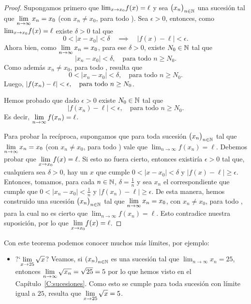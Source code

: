 \begin{proof}
Supongamos primero que ${\lim_{x\to x_0}} f(x)=\ell$ y sea $\big(x_n\big)_{n\in\mathbb{N}}$ una sucesión tal que $\displaystyle\lim_{n\to\infty} x_n = x_0$ (con $x_n\neq x_0$, para todo \niN).
Sea $\epsilon>0$, entonces, como ${\lim_{x\to x_0}} f(x)=\ell$ existe $\delta>0$ tal que
\[
0<|x-x_0|<\delta\quad\implies\quad |f(x)-\ell|<\epsilon.
\]
Ahora bien, como $\displaystyle\lim_{n\to\infty} x_n = x_0$, para ese $\delta>0$, existe $N_0\in\mathbb{N}$ tal que
\[
|x_n-x_0|<\delta, \quad\text{para todo $n\ge N_0$}.
\]
Como además $x_n\neq x_0$, para todo \niN, resulta que 
\[
0<|x_n-x_0|<\delta, \quad\text{para todo $n\ge N_0$}.
\]
Luego, $\displaystyle |f(x_n)-\ell|<\epsilon, \quad\text{para todo $n\ge N_0$}$.

Hemos probado que dado $\epsilon>0$ existe $N_0\in\mathbb{N}$ tal que 
\[
|f(x_n)-\ell|<\epsilon, \quad\text{para todo $n\ge N_0$}.
\]
Es decir, $\displaystyle\lim_{n\to\infty}f(x_n) = \ell$.

Para probar la recíproca, supongamos que para toda sucesión $\big(x_n\big)_{n\in\mathbb{N}}$ tal que $\displaystyle\lim_{n\to\infty} x_n = x_0$ (con $x_n\neq x_0$, para todo \niN) vale que $\lim_{n\to\infty}f(x_n)=\ell$.
Debemos probar que $\displaystyle{\ensuremath{\lim_{x\to x_0}}} f(x)=\ell$.
Si esto no fuera cierto, entonces existiría $\epsilon>0$ tal que, cualquiera sea $\delta>0$, hay un $x$ que cumple $0<|x-x_0|<\delta$ y $|f(x)-\ell|\ge \epsilon$.
Entonces, tomamos, para cada $n\in\mathbb{N}$, $\delta=\frac1n$ y sea $x_n$ el correspondiente que cumple que $0<|x_n-x_0|<\frac1n$ y $|f(x_n)-\ell|\ge \epsilon$.
De esta manera, hemos construido una sucesión $\big(x_n\big)_{n\in\mathbb{N}}$ tal que $\displaystyle\lim_{n\to\infty} x_n = x_0$, con $x_n\neq x_0$, para todo \niN, para la cual no es cierto que $\lim_{n\to\infty}f(x_n)=\ell$. Esto contradice nuestra suposición, por lo que $\displaystyle{\ensuremath{\lim_{x\to x_0}}} f(x)=\ell$.
\end{proof}


\begin{example}
Con este teorema podemos conocer muchos más límites, por ejemplo:
\begin{itemize}
\item ?`$\displaystyle \lim_{x\to 25} \sqrt{x} $?
Veamos, si $\left(x_n\right)_{n\in\mathbb{N}}$ es una sucesión tal que $\lim_{n\to\infty} x_n = 25$, entonces $\displaystyle \lim_{n\to\infty} \sqrt{x_n} = \sqrt{25}=5$ por lo que hemos visto en el Capítulo~\ref{C:sucesiones}. Como esto se cumple para toda sucesión con límite igual a $25$, resulta que $\displaystyle \lim_{x\to 25} \sqrt{x} = 5$.
\end{itemize}
    
\end{example}

